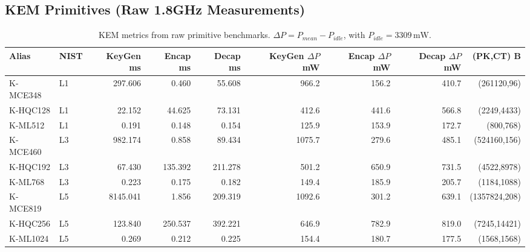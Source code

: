 \subsection{KEM Primitives (Raw 1.8GHz Measurements)}
\begin{table}[t]
\centering
\caption{KEM metrics from raw primitive benchmarks. $\Delta P = P_{mean} - P_{idle}$, with $P_{idle}=3309\,\mathrm{mW}$.}
\footnotesize
\setlength{\tabcolsep}{3pt}
\begin{tabular}{@{}llrrrrrrr@{}}\toprule
Alias & NIST & KeyGen ms & Encap ms & Decap ms & KeyGen $\Delta P$ mW & Encap $\Delta P$ mW & Decap $\Delta P$ mW & (PK,CT) B \\ \midrule
K-MCE348 & L1 & 297.606 & 0.460 & 55.608 & 966.2 & 156.2 & 410.7 & (261120,96) \\
K-HQC128 & L1 & 22.152 & 44.625 & 73.131 & 412.6 & 441.6 & 566.8 & (2249,4433) \\
K-ML512 & L1 & 0.191 & 0.148 & 0.154 & 125.9 & 153.9 & 172.7 & (800,768) \\
K-MCE460 & L3 & 982.174 & 0.858 & 89.434 & 1075.7 & 279.6 & 485.1 & (524160,156) \\
K-HQC192 & L3 & 67.430 & 135.392 & 211.278 & 501.2 & 650.9 & 731.5 & (4522,8978) \\
K-ML768 & L3 & 0.223 & 0.175 & 0.182 & 149.4 & 185.9 & 205.7 & (1184,1088) \\
K-MCE819 & L5 & 8145.041 & 1.856 & 209.319 & 1092.6 & 301.2 & 639.1 & (1357824,208) \\
K-HQC256 & L5 & 123.840 & 250.537 & 392.221 & 646.9 & 782.9 & 819.0 & (7245,14421) \\
K-ML1024 & L5 & 0.269 & 0.212 & 0.225 & 154.4 & 180.7 & 177.5 & (1568,1568) \\
\bottomrule\end{tabular}
\label{tab:res-kem-manual}
\end{table}

